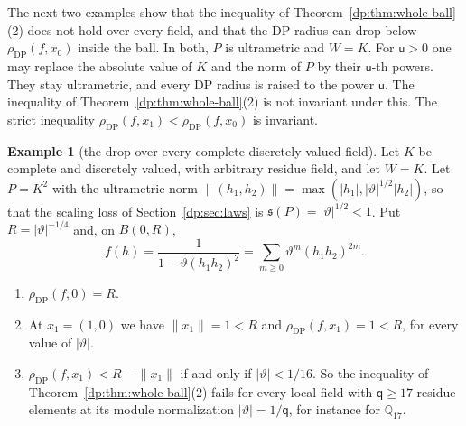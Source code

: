 \documentclass[11pt]{amsart}
\theoremstyle{definition}
\theoremstyle{remark}
\numberwithin{equation}{section}
\newcommand{\abs}[1]{\lvert #1\rvert}
\newcommand{\norm}[1]{\lVert #1\rVert}
\theoremstyle{plain}
\theoremstyle{definition}
\newtheorem{example}[theorem]{Example}
\theoremstyle{plain}
\begin{document}
The next two examples show that the inequality of Theorem~\ref{dp:thm:whole-ball}(2) does not hold over every field, and that the DP radius can drop below $\rho_{\mathrm{DP}}(f,x_0)$ inside the ball. In both, $P$ is ultrametric and $W=K$. For $\mathsf u>0$ one may replace the absolute value of $K$ and the norm of $P$ by their $\mathsf u$-th powers. They stay ultrametric, and every DP radius is raised to the power $\mathsf u$. The inequality of Theorem~\ref{dp:thm:whole-ball}(2) is not invariant under this. The strict inequality $\rho_{\mathrm{DP}}(f,x_1)<\rho_{\mathrm{DP}}(f,x_0)$ is invariant.

\begin{example}[the drop over every complete discretely valued field]\label{dp:ex:radius-drop}
Let $K$ be complete and discretely valued, with arbitrary residue field, and let $W=K$. Let $P=K^2$ with the ultrametric norm $\norm{(h_1,h_2)}=\max(\abs{h_1},\abs\vartheta^{1/2}\abs{h_2})$, so that the scaling loss of Section~\ref{dp:sec:laws} is $\mathfrak s(P)=\abs\vartheta^{1/2}<1$. Put $R=\abs\vartheta^{-1/4}$ and, on $B(0,R)$,
\[
 f(h)=\frac1{1-\vartheta(h_1h_2)^2}=\sum_{m\ge0}\vartheta^m(h_1h_2)^{2m}.
\]
\begin{enumerate}
\item $\rho_{\mathrm{DP}}(f,0)=R$.
\item At $x_1=(1,0)$ we have $\norm{x_1}=1<R$ and $\rho_{\mathrm{DP}}(f,x_1)=1<R$, for every value of $\abs\vartheta$.
\item $\rho_{\mathrm{DP}}(f,x_1)<R-\norm{x_1}$ if and only if $\abs\vartheta<1/16$. So the inequality of Theorem~\ref{dp:thm:whole-ball}(2) fails for every local field with $\mathsf q\ge17$ residue elements at its module normalization $\abs\vartheta=1/\mathsf q$, for instance for $\mathbb Q_{17}$.
\end{enumerate}
\end{example}
\end{document}
